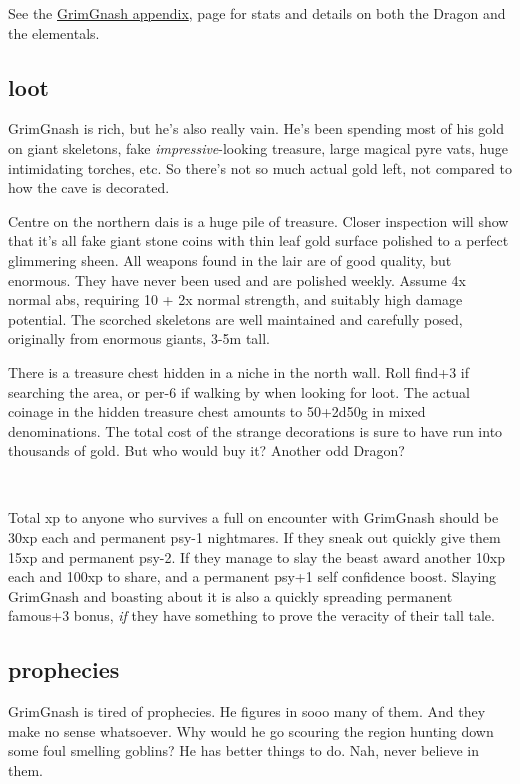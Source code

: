 See the \hyperref[appendixgrimgnash]{GrimGnash appendix}, page \pageref{appendixgrimgnash} for stats and details on both the Dragon and the elementals.


\subsection*{loot}

GrimGnash is rich, but he's also really vain. He's been spending most of his gold on giant skeletons, fake \emph{impressive}-looking treasure, large magical pyre vats, huge intimidating torches, etc. So there's not so much actual gold left, not compared to how the cave is decorated. 

Centre on the northern dais is a huge pile of treasure. Closer inspection will show that it's all fake giant stone coins with thin leaf gold surface polished to a perfect glimmering sheen.
All weapons found in the lair are of good quality, but enormous. They have never been used and are polished weekly. Assume 4x normal abs, requiring 10 + 2x normal strength, and suitably high damage potential. The scorched skeletons are well maintained and carefully posed, originally from enormous giants, 3-5m tall.

There is a treasure chest hidden in a niche in the north wall. Roll find+3 if searching the area, or per-6 if walking by when looking for loot. The actual coinage in the hidden treasure chest amounts to 50+2d50g in mixed denominations. The total cost of the strange decorations is sure to have run into thousands of gold. But who would buy it? Another odd Dragon?

\

Total xp to anyone who survives a full on encounter with GrimGnash should be 30xp each and permanent psy-1 nightmares. If they sneak out quickly give them 15xp and permanent psy-2. If they manage to slay the beast award another 10xp each and 100xp to share, and a permanent psy+1 self confidence boost. Slaying GrimGnash and boasting about it is also a quickly spreading permanent famous+3 bonus, \emph{if} they have something to prove the veracity of their tall tale.


\subsection*{prophecies}

GrimGnash is tired of prophecies. He figures in sooo many of them. And they make no sense whatsoever. Why would he go scouring the region hunting down some foul smelling goblins? He has better things to do. Nah, never believe in them.

